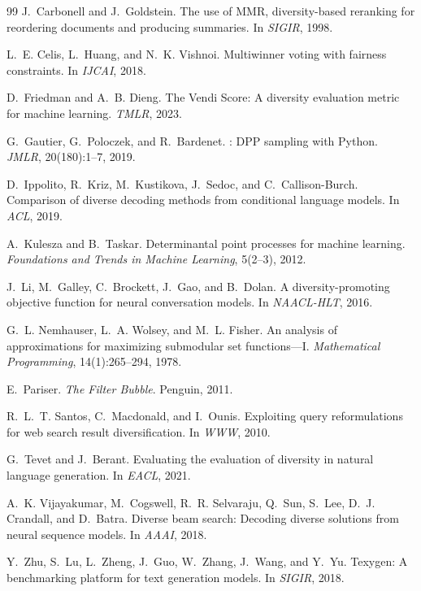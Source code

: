 \documentclass[11pt]{article}
\begin{document}
\begin{thebibliography}{99}
J.~Carbonell and J.~Goldstein.
\newblock The use of {MMR}, diversity-based reranking for reordering documents
  and producing summaries.
\newblock In \emph{SIGIR}, 1998.

L.~E. Celis, L.~Huang, and N.~K. Vishnoi.
\newblock Multiwinner voting with fairness constraints.
\newblock In \emph{IJCAI}, 2018.

D.~Friedman and A.~B. Dieng.
\newblock The {V}endi {S}core: A diversity evaluation metric for machine
  learning.
\newblock \emph{TMLR}, 2023.

G.~Gautier, G.~Poloczek, and R.~Bardenet.
: {DPP} sampling with {P}ython.
\newblock \emph{JMLR}, 20(180):1--7, 2019.

D.~Ippolito, R.~Kriz, M.~Kustikova, J.~Sedoc, and C.~Callison-Burch.
\newblock Comparison of diverse decoding methods from conditional language
  models.
\newblock In \emph{ACL}, 2019.

A.~Kulesza and B.~Taskar.
\newblock Determinantal point processes for machine learning.
\newblock \emph{Foundations and Trends in Machine Learning}, 5(2--3), 2012.

J.~Li, M.~Galley, C.~Brockett, J.~Gao, and B.~Dolan.
\newblock A diversity-promoting objective function for neural conversation
  models.
\newblock In \emph{NAACL-HLT}, 2016.

G.~L. Nemhauser, L.~A. Wolsey, and M.~L. Fisher.
\newblock An analysis of approximations for maximizing submodular set
  functions---{I}.
\newblock \emph{Mathematical Programming}, 14(1):265--294, 1978.

E.~Pariser.
\newblock \emph{The Filter Bubble}.
\newblock Penguin, 2011.

R.~L.~T. Santos, C.~Macdonald, and I.~Ounis.
\newblock Exploiting query reformulations for web search result
  diversification.
\newblock In \emph{WWW}, 2010.

G.~Tevet and J.~Berant.
\newblock Evaluating the evaluation of diversity in natural language generation.
\newblock In \emph{EACL}, 2021.

A.~K. Vijayakumar, M.~Cogswell, R.~R. Selvaraju, Q.~Sun, S.~Lee,
  D.~J. Crandall, and D.~Batra.
\newblock Diverse beam search: Decoding diverse solutions from neural sequence
  models.
\newblock In \emph{AAAI}, 2018.

Y.~Zhu, S.~Lu, L.~Zheng, J.~Guo, W.~Zhang, J.~Wang, and Y.~Yu.
\newblock Texygen: A benchmarking platform for text generation models.
\newblock In \emph{SIGIR}, 2018.
\end{thebibliography}
\end{document}
